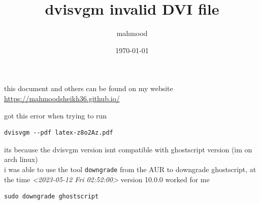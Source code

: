 \documentclass[a4paper,12pt]{article}
\author{mahmood}
\date{\today}
\title{dvisvgm invalid DVI file}
\begin{document}
\maketitle
\begin{note}
this document and others can be found on my website\\
\url{https://mahmoodsheikh36.github.io/}
\end{note}
got this error when trying to run\\
\lstset{language=bash,label= ,caption= ,captionpos=b,numbers=none}
\begin{lstlisting}
dvisvgm --pdf latex-z8o2Az.pdf
\end{lstlisting}
its because the dvisvgm version isnt compatible with ghostscript version (im on arch linux)\\
i was able to use the tool \texttt{downgrade} from the AUR to downgrade ghostscript, at the time \textit{<2023-05-12 Fri 02:52:00> } version 10.0.0 worked for me\\
\lstset{language=bash,label= ,caption= ,captionpos=b,numbers=none}
\begin{lstlisting}
sudo downgrade ghostscript
\end{lstlisting}
\end{document}
